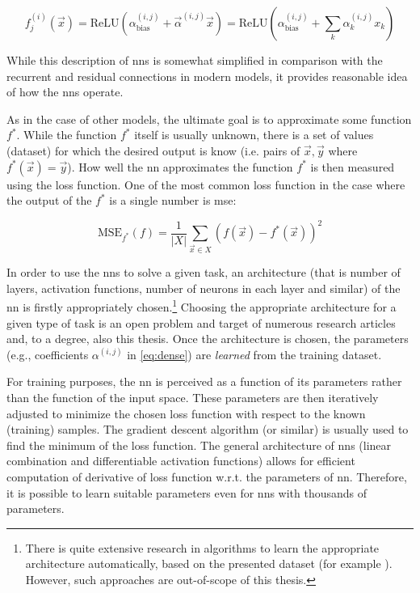 \begin{equation}
    \label{eq:dense}
    f^{(i)}_j(\vec{x}) = \mathrm{ReLU}\left(\alpha_{\mathrm{bias}}^{(i,j)} + \vec{\alpha}^{(i,j)} \vec{x}\right) = \mathrm{ReLU}\left(\alpha_{\mathrm{bias}}^{(i,j)} + \sum_{k}\alpha_k^{(i,j)}x_k\right)
\end{equation}

While this description of \glspl{nn} is somewhat simplified in comparison with the recurrent and residual connections in modern models, it provides reasonable idea of how the \glspl{nn} operate.

As in the case of other  models, the ultimate goal is to approximate some function $f^*$. While the function $f^*$ itself is usually unknown, there is a set of values (dataset) for which the desired output is know (i.e. pairs of $\vec{x}, \vec{y}$ where $f^*(\vec{x}) = \vec{y}$). How well the \gls{nn} approximates the function $f^*$ is then measured using the loss function. One of the most common loss function in the case where the output of the $f^*$ is a single number is \gls{mse}:

$$\text{MSE}_{f^*}(f) = \frac{1}{|X|} \sum_{\vec{x} \in X} (f(\vec{x}) - f^*(\vec{x}))^2$$

In order to use the \glspl{nn} to solve a given task, an architecture (that is number of layers, activation functions, number of neurons in each layer and similar) of the \gls{nn} is firstly appropriately chosen.\footnote{There is quite extensive research in algorithms to learn the appropriate architecture automatically, based on the presented dataset (for example \cite{neat}). However, such approaches are out-of-scope of this thesis.} Choosing the appropriate architecture for a given type of task is an open problem and target of numerous research articles and, to a degree, also this thesis. Once the architecture is chosen, the parameters (e.g., coefficients $\alpha^{(i,j)}$ in \autoref{eq:dense}) are \emph{learned} from the training dataset.

For training purposes, the \gls{nn} is perceived as a function of its parameters rather than the function of the input space. These parameters are then iteratively adjusted to minimize the chosen loss function with respect to the known (training) samples. The gradient descent algorithm (or similar) is usually used to find the minimum of the loss function. The general architecture of \glspl{nn} (linear combination and differentiable activation functions) allows for efficient computation of derivative of loss function w.r.t. the parameters of \gls{nn}. Therefore, it is possible to learn suitable parameters even for \glspl{nn} with thousands of parameters.

